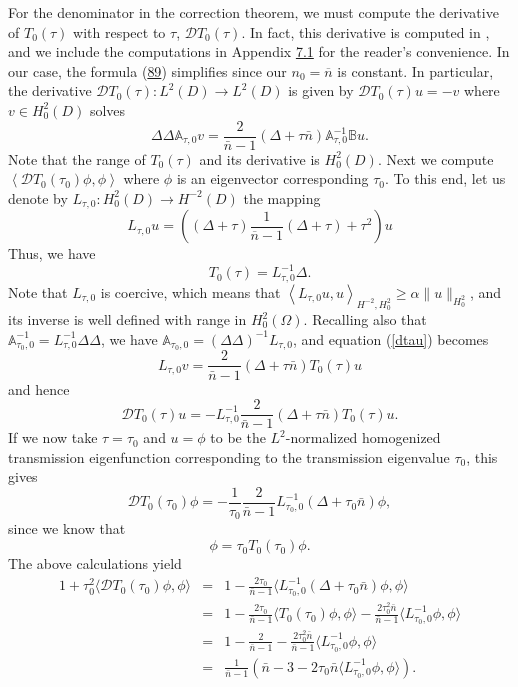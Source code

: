 \documentclass[10pt,a4paper]{amsart}
\begin{document}
\noindent
For the denominator in the correction theorem, we must compute the derivative of $T_0(\tau)$ with respect to $\tau$, ${\mathcal D}T_0(\tau)$. In fact, this derivative is computed  in  \cite{CaMoRo}, and we include the computations in Appendix \href{https://arxiv.org/abs/2508.21174v1}{7.1} for the reader's convenience. In our case, the formula (\href{https://arxiv.org/abs/2508.21174v1}{89}) simplifies since our $n_0 =\overline{n}$ is constant.  In particular, the derivative ${\mathcal D}T_0(\tau): L^2(D)\to L^2(D)$ is  given by $\mathcal{D}T_0(\tau)u= -v$ where $v\in H^2_0(D)$ solves 
\begin{equation}\label{dtau}
\Delta\Delta \mathbb{A}_{\tau,0} v=  \frac{2}{\bar n-1}(\Delta + \tau \bar n) \mathbb{A}^{-1}_{\tau,0}\mathbb{B} u.
\end{equation}
Note that the range of $T_0(\tau)$ and its derivative is $H^2_0(D)$. Next we compute $\left<{\mathcal D}T_0(\tau_0) \phi,\phi \right>$ where $\phi$ is an eigenvector corresponding $\tau_0$. To this end, let us denote by $L_{\tau,0}:H^2_0(D)\to H^{-2}(D)$ the mapping
\begin{equation} \label{Ltau0} L_{\tau,0} u =\left( (\Delta +\tau ) \frac{1}{\overline{n}-1} (\Delta +\tau ) +\tau^2 \right)u\end{equation}
Thus, we have $$ T_0 (\tau)=L_{\tau,0}^{-1}\Delta.$$  Note that $L_{\tau,0}$ is coercive, which means that $\left<L_{\tau,0}u,u\right>_{H^{-2}, H^2_0}\geq \alpha \|u\|_{H^2_0}$, and its inverse is well defined with range in $H^2_0(\Omega)$. Recalling also that $\mathbb{A}^{-1}_{\tau_0,0}=L_{\tau,0}^{-1}\Delta\Delta$, we have $\mathbb{A}_{\tau_0,0}=(\Delta\Delta)^{-1} L_{\tau,0}$, and equation (\ref{dtau}) becomes 
\begin{equation}\label{dtau2}
{L}_{\tau,0} v=  \frac{2}{\bar n-1}(\Delta + \tau \bar n) T_0(\tau) u 
\end{equation}
and hence 
\begin{equation}\label{dtau3}
 \mathcal{D}T_0(\tau)u =- {L}_{\tau,0}^{-1} \frac{2}{\bar n-1}(\Delta + \tau \bar n) T_0(\tau) u. 
\end{equation}
If we now take $\tau=\tau_0$ and $u=\phi$ to be the  $L^2$-normalized homogenized transmission eigenfunction corresponding to the  transmission eigenvalue $\tau_0$,  this gives  $$\mathcal{D}T_0(\tau_0)\phi =-\frac{1}{\tau_0}\frac{2}{\bar n-1}L^{-1}_{\tau_0,0}(\Delta + \tau_0 \bar n)\phi,$$
since we know that 
$$  \phi=\tau_0 T_0(\tau_0) \phi. $$ The above calculations yield 
\begin{eqnarray}
1+ \tau_0^2\langle {\mathcal D}T_0(\tau_0) \phi,\phi \rangle &=&1-\frac{2\tau_0}{\bar n-1}\langle L^{-1}_{\tau_0,0}(\Delta + \tau_0 \bar n)\phi,\phi\rangle \label{denomform}\\
&=&1-\frac{2\tau_0}{\bar n-1}\langle T_0(\tau_0) \phi,\phi\rangle -\frac{2\tau^2_0 \bar n}{\bar n-1}\langle L^{-1}_{\tau_0,0}\phi,\phi\rangle\nonumber \\
&=&1-\frac{2}{\bar n-1}-\frac{2\tau^2_0 \bar n}{\bar n-1}\langle L^{-1}_{\tau_0,0}\phi,\phi\rangle\nonumber\\ &=& \frac{1}{\bar n-1}\left(\bar n-3  -2\tau_0\bar n \langle L^{-1}_{\tau_0,0}\phi,\phi\rangle\right).
\nonumber\end{eqnarray}
\end{document}
